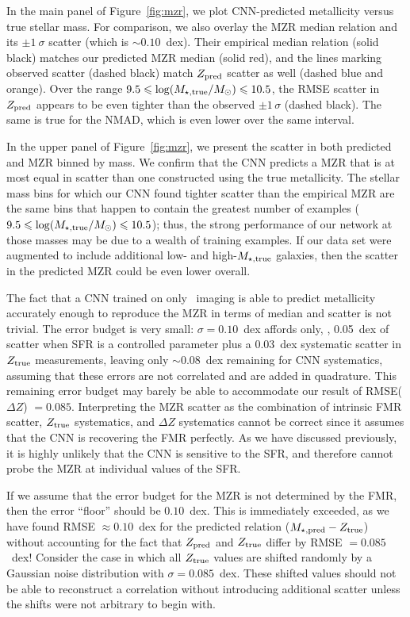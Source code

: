 \documentclass[fleqn,usenatbib]{mnras}
\begin{document}
In the main panel of Figure~\ref{fig:mzr}, we plot CNN-predicted metallicity versus true stellar mass. For comparison, we also overlay the \cite{Tremonti2004} MZR median relation and its $\pm 1~\sigma$ scatter (which is $\sim 0.10$~dex). Their empirical median relation (solid black) matches our predicted MZR median (solid red), and the lines marking observed scatter (dashed black) match $Z_{\rm pred}$ scatter as well (dashed blue and orange). Over the range $9.5 \leqslant \log (M_{\star, \rm true}/\hbox{$M_\odot$}) \leqslant 10.5$, the RMSE scatter in $Z_{\rm pred}$ appears to be even tighter than the observed $\pm 1\,\sigma$ (dashed black). The same is true for the NMAD, which is even lower over the same interval.

In the upper panel of Figure~\ref{fig:mzr}, we present the scatter in both predicted and \cite{Tremonti2004} MZR binned by mass. We confirm that the CNN predicts a MZR that is at most equal in scatter than one constructed using the true metallicity. The stellar mass bins for which our CNN found tighter scatter than the empirical MZR are the same bins that happen to contain the greatest number of examples ($9.5 \leqslant \log (M_{\star, \rm true}/\hbox{$M_\odot$}) \leqslant 10.5$); thus, the strong performance of our network at those masses may be due to a wealth of training examples. If our data set were augmented to include additional low- and high-$M_{\rm \star,true}$ galaxies, then the scatter in the predicted MZR could be even lower overall.

The fact that a CNN trained on only \sdssg\sdssr\sdssi\ imaging is able to predict metallicity accurately enough to reproduce the MZR in terms of median and scatter is not trivial. The error budget is very small: $\sigma = 0.10$~dex affords only, \eg, 0.05~dex of scatter when SFR is a controlled parameter plus a 0.03~dex systematic scatter in $Z_{\rm true}$ measurements, leaving only $\sim 0.08$~dex remaining for CNN systematics, assuming that these errors are not correlated and are added in quadrature. This remaining error budget may barely be able to accommodate our result of RMSE($\Delta Z$) $= 0.085$.
Interpreting the MZR scatter as the combination of intrinsic FMR scatter, $Z_{\rm true}$ systematics, and $\Delta Z$ systematics cannot be correct since it assumes that the CNN is recovering the FMR perfectly.
As we have discussed previously, it is highly unlikely that the CNN is sensitive to the SFR, and therefore cannot probe the MZR at individual values of the SFR.

If we assume that the error budget for the MZR is not determined by the FMR, then the error ``floor'' should be $0.10$~dex.
This is immediately exceeded, as we have found RMSE $\approx 0.10$~dex for the predicted relation ($M_{\star,\rm pred}-Z_{\rm true}$) without accounting for the fact that $Z_{\rm pred}$ and $Z_{\rm true}$ differ by RMSE $= 0.085$~dex!
Consider the case in which all $Z_{\rm true}$ values are shifted randomly by a Gaussian noise distribution with $\sigma = 0.085$~dex.
These shifted values should not be able to reconstruct a correlation without introducing additional scatter unless the shifts were not arbitrary to begin with.
\end{document}
